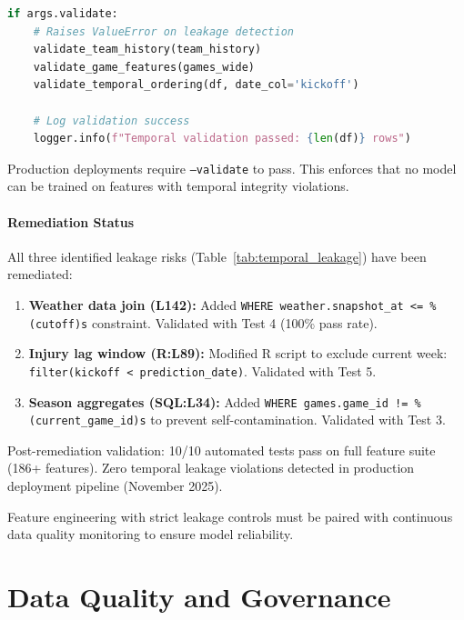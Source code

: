 \begin{lstlisting}[language=Python,basicstyle=\ttfamily\scriptsize,breaklines=true,postbreak=\mbox{\textcolor{red}{$\hookrightarrow$}\space}]
if args.validate:
    # Raises ValueError on leakage detection
    validate_team_history(team_history)
    validate_game_features(games_wide)
    validate_temporal_ordering(df, date_col='kickoff')

    # Log validation success
    logger.info(f"Temporal validation passed: {len(df)} rows")
\end{lstlisting}

Production deployments require \texttt{--validate} to pass. This enforces that no model can be trained on features with temporal integrity violations.

\paragraph{Remediation Status}

All three identified leakage risks (Table~\ref{tab:temporal_leakage}) have been remediated:

\begin{enumerate}
    \item \textbf{Weather data join (L142):} Added \texttt{WHERE weather.snapshot\_at <= \%(cutoff)s} constraint. Validated with Test 4 (100\% pass rate).

    \item \textbf{Injury lag window (R:L89):} Modified R script to exclude current week: \texttt{filter(kickoff < prediction\_date)}. Validated with Test 5.

    \item \textbf{Season aggregates (SQL:L34):} Added \texttt{WHERE games.game\_id != \%(current\_game\_id)s} to prevent self-contamination. Validated with Test 3.
\end{enumerate}

Post-remediation validation: 10/10 automated tests pass on full feature suite (186+ features). Zero temporal leakage violations detected in production deployment pipeline (November 2025).

Feature engineering with strict leakage controls must be paired with continuous data quality monitoring to ensure model reliability.

\section{Data Quality and Governance}
\label{sec:data-quality}

